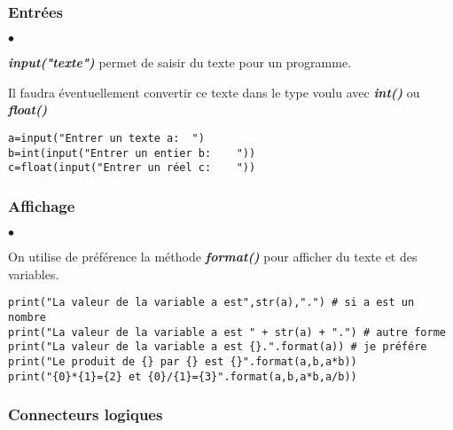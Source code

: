 \documentclass[10pt,dvipsnames,  dvips]{article}
\begin{document}
\subsubsection*{Entrées}


\begin{minipage}[t]{9cm}
\begin{list}{$\bullet$}{}
\item \textbf{\textit{input("texte")}} permet de saisir du texte pour un programme.
\item Il faudra éventuellement convertir ce texte dans le type voulu avec \textbf{\textit{int()}} ou \textbf{\textit{float()}}
\end{list}
\end{minipage}
\hspace{0.5cm}
\begin{minipage}[t]{8cm}
\lstset{ style=PYTHON}
\begin{lstlisting}
a=input("Entrer un texte a:  ")
b=int(input("Entrer un entier b:    "))
c=float(input("Entrer un réel c:    "))
\end{lstlisting}
\end{minipage}


\subsubsection*{Affichage}

\begin{list}{$\bullet$}{}
\item On utilise de préférence la méthode \textbf{\textit{format()}} pour afficher du texte et des variables.
\end{list}

\begin{lstlisting}
print("La valeur de la variable a est",str(a),".") # si a est un nombre
print("La valeur de la variable a est " + str(a) + ".") # autre forme
print("La valeur de la variable a est {}.".format(a)) # je préfére
print("Le produit de {} par {} est {}".format(a,b,a*b))
print("{0}*{1}={2} et {0}/{1}={3}".format(a,b,a*b,a/b))
\end{lstlisting}

\subsubsection*{Connecteurs logiques}
\end{document}
